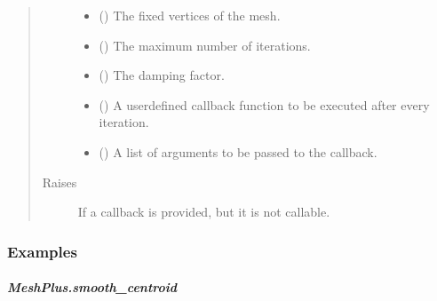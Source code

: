 \documentclass[letterpaper,10pt,english]{sphinxmanual}
\begin{document}
\begin{fulllineitems}
\begin{fulllineitems}
\begin{quote}
\begin{description}
\begin{itemize}
\item {} 
 () \textendash{} The fixed vertices of the mesh.

\item {} 
 () \textendash{} The maximum number of iterations.

\item {} 
 () \textendash{} The damping factor.

\item {} 
 () \textendash{} A user\sphinxhyphen{}defined callback function to be executed after every iteration.

\item {} 
 () \textendash{} A list of arguments to be passed to the callback.

\end{itemize}

\item[{Raises}] \leavevmode
{} \textendash{} If a callback is provided, but it is not callable.

\end{description}\end{quote}
\subsubsection*{Examples}

\begin{sphinxVerbatim}[commandchars=\\\{\}]
\end{sphinxVerbatim}

\end{fulllineitems}



\subparagraph{MeshPlus.smooth\_centroid}
\label{\detokenize{api/generated/directional_clustering.mesh.MeshPlus.smooth_centroid:meshplus-smooth-centroid}}\label{\detokenize{api/generated/directional_clustering.mesh.MeshPlus.smooth_centroid::doc}}


\end{fulllineitems}
\end{document}
